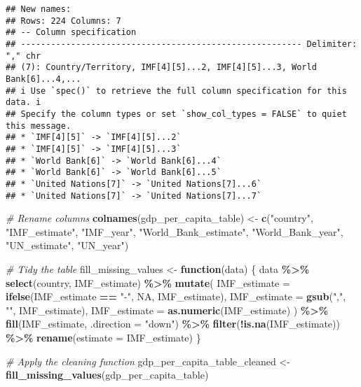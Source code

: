 \documentclass[
]{article}
\newenvironment{Shaded}{\begin{snugshade}}{\end{snugshade}}
\newcommand{\AttributeTok}[1]{\textcolor[rgb]{0.13,0.29,0.53}{#1}}
\newcommand{\CommentTok}[1]{\textcolor[rgb]{0.56,0.35,0.01}{\textit{#1}}}
\newcommand{\ConstantTok}[1]{\textcolor[rgb]{0.56,0.35,0.01}{#1}}
\newcommand{\ControlFlowTok}[1]{\textcolor[rgb]{0.13,0.29,0.53}{\textbf{#1}}}
\newcommand{\FunctionTok}[1]{\textcolor[rgb]{0.13,0.29,0.53}{\textbf{#1}}}
\newcommand{\NormalTok}[1]{#1}
\newcommand{\OtherTok}[1]{\textcolor[rgb]{0.56,0.35,0.01}{#1}}
\newcommand{\SpecialCharTok}[1]{\textcolor[rgb]{0.81,0.36,0.00}{\textbf{#1}}}
\newcommand{\StringTok}[1]{\textcolor[rgb]{0.31,0.60,0.02}{#1}}
\begin{document}
\begin{verbatim}
## New names:
## Rows: 224 Columns: 7
## -- Column specification
## -------------------------------------------------------- Delimiter: "," chr
## (7): Country/Territory, IMF[4][5]...2, IMF[4][5]...3, World Bank[6]...4,...
## i Use `spec()` to retrieve the full column specification for this data. i
## Specify the column types or set `show_col_types = FALSE` to quiet this message.
## * `IMF[4][5]` -> `IMF[4][5]...2`
## * `IMF[4][5]` -> `IMF[4][5]...3`
## * `World Bank[6]` -> `World Bank[6]...4`
## * `World Bank[6]` -> `World Bank[6]...5`
## * `United Nations[7]` -> `United Nations[7]...6`
## * `United Nations[7]` -> `United Nations[7]...7`
\end{verbatim}

\begin{Shaded}
\begin{Highlighting}[]
\CommentTok{\# Rename columns}
\FunctionTok{colnames}\NormalTok{(gdp\_per\_capita\_table) }\OtherTok{\textless{}{-}} \FunctionTok{c}\NormalTok{(}\StringTok{"country"}\NormalTok{, }\StringTok{"IMF\_estimate"}\NormalTok{, }\StringTok{"IMF\_year"}\NormalTok{, }
                                    \StringTok{"World\_Bank\_estimate"}\NormalTok{, }\StringTok{"World\_Bank\_year"}\NormalTok{, }
                                    \StringTok{"UN\_estimate"}\NormalTok{, }\StringTok{"UN\_year"}\NormalTok{)}

\CommentTok{\# Tidy the table}
\NormalTok{fill\_missing\_values }\OtherTok{\textless{}{-}} \ControlFlowTok{function}\NormalTok{(data) \{}
\NormalTok{  data }\SpecialCharTok{\%\textgreater{}\%}
    \FunctionTok{select}\NormalTok{(country, IMF\_estimate) }\SpecialCharTok{\%\textgreater{}\%}              
    \FunctionTok{mutate}\NormalTok{(}
      \AttributeTok{IMF\_estimate =} \FunctionTok{ifelse}\NormalTok{(IMF\_estimate }\SpecialCharTok{==} \StringTok{"{-}"}\NormalTok{, }\ConstantTok{NA}\NormalTok{, IMF\_estimate), }
      \AttributeTok{IMF\_estimate =} \FunctionTok{gsub}\NormalTok{(}\StringTok{","}\NormalTok{, }\StringTok{""}\NormalTok{, IMF\_estimate),      }
      \AttributeTok{IMF\_estimate =} \FunctionTok{as.numeric}\NormalTok{(IMF\_estimate)         }
\NormalTok{    ) }\SpecialCharTok{\%\textgreater{}\%}
    \FunctionTok{fill}\NormalTok{(IMF\_estimate, }\AttributeTok{.direction =} \StringTok{"down"}\NormalTok{) }\SpecialCharTok{\%\textgreater{}\%}       
    \FunctionTok{filter}\NormalTok{(}\SpecialCharTok{!}\FunctionTok{is.na}\NormalTok{(IMF\_estimate)) }\SpecialCharTok{\%\textgreater{}\%}                  
    \FunctionTok{rename}\NormalTok{(}\AttributeTok{estimate =}\NormalTok{ IMF\_estimate)                  }
\NormalTok{\}}

\CommentTok{\# Apply the cleaning function}
\NormalTok{gdp\_per\_capita\_table\_cleaned }\OtherTok{\textless{}{-}} \FunctionTok{fill\_missing\_values}\NormalTok{(gdp\_per\_capita\_table)}
\end{Highlighting}
\end{Shaded}
\end{document}
